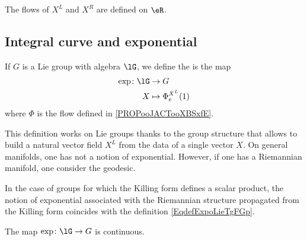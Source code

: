 \begin{proposition}
    The flows of \( X^L\) and \( X^R\) are defined on \( \eR\).
\end{proposition}

\subsection{Integral curve and exponential}

\begin{definition}     \label{DEFooOLLZooMHRgsz}
    If \( G\) is a Lie group with algebra \( \lG\), we define the  is the map
    \begin{equation}\label{EqdefExpoLieTgFGp}
        \begin{aligned}
            \exp\colon \lG&\to G \\
            X&\mapsto \Phi^{X^L}_e(1)
        \end{aligned}
    \end{equation}
    where \( \Phi\) is the flow defined in \ref{PROPooJACTooXBSxfE}.
\end{definition}

\begin{normaltext}
    This definition works on Lie groups thanks to the group structure that allows to build a natural vector field \( X^L\) from the data of a single vector \( X\). On general manifolds, one has not a notion of exponential. However, if one has a Riemannian manifold, one consider the geodesic.

    In the case of groups for which the Killing form defines a scalar product, the notion of exponential associated with the Riemannian structure propagated from the Killing form coincides with the definition \eqref{EqdefExpoLieTgFGp}.
\end{normaltext}


\begin{proposition}     \label{PROPooMAGKooInwNom}
    The map \( \exp\colon \lG\to G\) is continuous.
\end{proposition}

